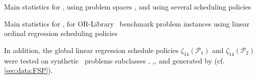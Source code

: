 \begin{table}\centering
\caption{Main statistics for \namerho, using problem spaces ,  and  using several scheduling policies}\label{tbl:comp:p1p2p3:summary}
%
\end{table}


%
\clearpage
\begin{table}\centering
\caption{Main statistics for \namerho, for OR-Library \jsp\ benchmark problem instances using linear ordinal regression scheduling policies}\label{tbl:comp:orlibjssp:summary}
%
\end{table}

In addition, the global linear regression schedule policies $\zeta_{14}(\mathcal{P}_1)$ and $\zeta_{14}(\mathcal{P}_2)$ were tested on synthetic \FSP\ problems subclasses , ,,  and  generated by \citet{Whitley} (cf. \cref{sec:data:FSP}). 

% 
%

